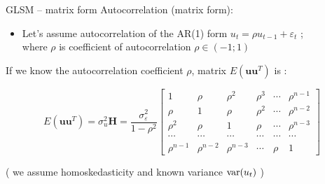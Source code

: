 \documentclass{beamer}
\begin{document}

\begin{frame}{GLSM – matrix form}
Autocorrelation (matrix form):
\begin{itemize}
\item Let's assume autocorrelation of the AR(1) form $u_t = \rho u_{t-1}+ \varepsilon_t$  ; \\ where $\rho$ is coefficient of autocorrelation $\rho \in (-1; 1)$
\end{itemize}
\vspace{0.2cm}
If we know the autocorrelation coefficient $\rho$,  matrix $E(\boldsymbol{uu}^T)$ is :

$$E(\boldsymbol{uu}^T)= \sigma^2_u\bm{H} = \frac{\sigma^2_{\varepsilon}}{1-\rho^2}
    \begin{bmatrix}
    1&  \rho & \rho^2 & \rho^3 & \cdots & \rho^{n-1}\\
    \rho &  1&  \rho & \rho^2 & \cdots & \rho^{n-2} \\ 
    \rho^2 &  \rho &  1& \rho  & \cdots & \rho^{n-3} \\ 
    \cdots & \cdots & \cdots & \cdots & \cdots & \cdots \\
     \rho^{n-1} & \rho^{n-2} & \rho^{n-3} & \cdots & \rho & 1
\end{bmatrix}$$

( we assume homoskedasticity and known variance $\textnormal{var}(u_t)$ )
\end{frame}

\end{document}
